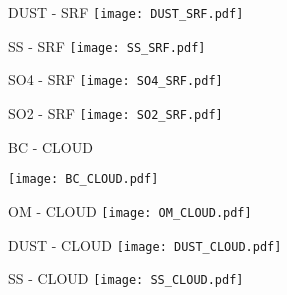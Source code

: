 \documentclass{beamer}
\begin{document}

\begin{frame}{DUST - SRF}
\texttt{[image: DUST\_SRF.pdf]} 
\end{frame}


\begin{frame}{SS - SRF}
\texttt{[image: SS\_SRF.pdf]} 
\end{frame}

\begin{frame}{SO4 - SRF}
\texttt{[image: SO4\_SRF.pdf]} 
\end{frame}

\begin{frame}{SO2 - SRF}
\texttt{[image: SO2\_SRF.pdf]} 
\end{frame}

\begin{frame}{BC - CLOUD}
\begin{center}
\texttt{[image: BC\_CLOUD.pdf]} 
\end{center}
\end{frame}


\begin{frame}{OM - CLOUD}
\texttt{[image: OM\_CLOUD.pdf]} 
\end{frame}


\begin{frame}{DUST - CLOUD}
\texttt{[image: DUST\_CLOUD.pdf]} 
\end{frame}


\begin{frame}{SS - CLOUD}
\texttt{[image: SS\_CLOUD.pdf]} 
\end{frame}
\end{document}
